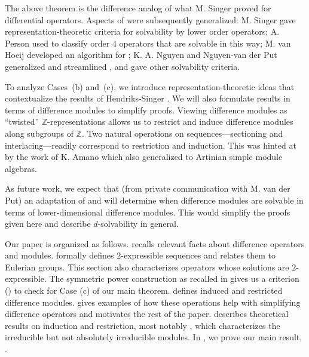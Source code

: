 \documentclass[11pt,reqno]{amsart}
\theoremstyle{definition}
\begin{document}
The above theorem is the difference analog of what M. Singer \cite{singer1985solving} proved for differential operators.
Aspects of \cite{singer1985solving} were subsequently generalized:
M. Singer \cite{singer1988algebraic} gave representation-theoretic criteria for solvability by lower order operators;
A. Person \cite{person2002solving} used \cite{singer1988algebraic} to classify order $4$ operators that are solvable in this way; 
M. van Hoeij \cite{hoeij2007solving} developed an algorithm for \cite{singer1985solving};
K. A. Nguyen \cite{nguyen2009d} and Nguyen-van der Put \cite{nguyen2010solving} generalized and streamlined \cite{singer1988algebraic}, and gave other solvability criteria.

To analyze Cases~(b) and~(c), we introduce representation-theoretic ideas that contextualize the results of Hendriks-Singer \cite{hendricks1999solving}.
We will also formulate results in terms of difference modules to simplify proofs. %
Viewing difference modules as ``twisted'' $\mathbb{Z}$-representations allows us to restrict and induce difference modules along subgroups of $\mathbb{Z}$.
Two natural operations on sequences---sectioning and interlacing---readily correspond to 
restriction and induction.
This was hinted at by the work of
K. Amano \cite[Section 3.7]{amano2006relative} which also generalized \cite{hendricks1999solving} to Artinian simple module algebras. 

As future work, we expect that (from private communication with M. van der Put) an adaptation of \cite{nguyen2009d} and \cite{nguyen2010solving} will determine when difference modules are solvable in terms of lower-dimensional difference modules. This would simplify the proofs given here and describe $d$-solvability in general.

Our paper is organized as follows. 
 recalls relevant facts about difference operators and modules.
 formally defines $2$-expressible sequences and relates them to Eulerian groups.
This section also characterizes operators whose solutions are $2$-expressible.
The symmetric power construction as recalled in  gives us a criterion () to check for Case (c) of our main theorem.
 defines induced and restricted difference modules.
 gives examples of how these operations help with simplifying difference operators and motivates the rest of the paper.
 describes theoretical results on induction and restriction,
most notably , which characterizes the irreducible but not absolutely irreducible modules.
In , we prove our main result, . 
\end{document}
